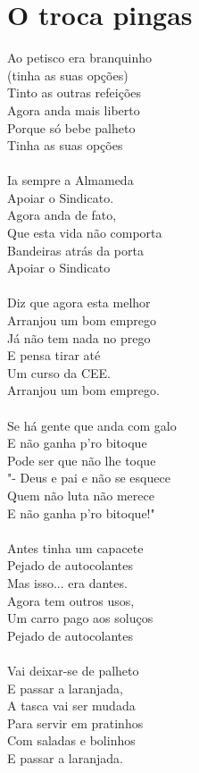 \documentclass{article}
\begin{document}
\section{ O troca pingas}
Ao petisco era branquinho\\
(tinha as suas opções)\\
Tinto as outras refeições\\
Agora anda mais liberto\\
Porque só bebe palheto\\
Tinha as suas opções\\
\\
Ia sempre a Almameda\\
Apoiar o Sindicato.\\
Agora anda de fato,\\
Que esta vida não comporta\\
Bandeiras atrás da porta\\
Apoiar o Sindicato\\
\\
Diz que agora esta melhor\\
Arranjou um bom emprego\\
Já não tem nada no prego\\
E pensa tirar até\\
Um curso da CEE.\\
Arranjou um bom emprego.\\
\\
Se há gente que anda com galo\\
E não ganha p'ro bitoque\\
Pode ser que não lhe toque\\
"- Deus e pai e não se esquece\\
Quem não luta não merece\\
E não ganha p'ro bitoque!"\\
\\
Antes tinha um capacete\\
Pejado de autocolantes\\
Mas isso... era dantes.\\
Agora tem outros usos,\\
Um carro pago aos soluços\\
Pejado de autocolantes\\
\\
Vai deixar-se de palheto\\
E passar a laranjada,\\
A tasca vai ser mudada\\
Para servir em pratinhos\\
Com saladas e bolinhos\\
E passar a laranjada.\\
\end{document}
